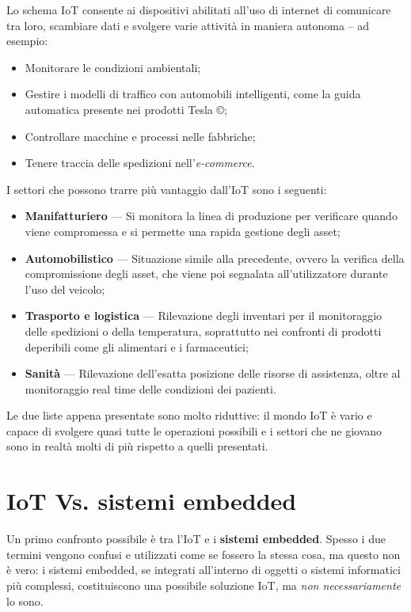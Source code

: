 \noindent Lo schema IoT consente ai dispositivi abilitati all'uso di internet di comunicare tra loro, scambiare dati e svolgere varie attività in maniera autonoma – ad esempio:
\begin{itemize}
    \item Monitorare le condizioni ambientali;
    \item Gestire i modelli di traffico con automobili intelligenti, come la guida automatica presente nei prodotti Tesla \copyright;
    \item Controllare macchine e processi nelle fabbriche;
    \item Tenere traccia delle spedizioni nell'\textit{e-commerce}.
\end{itemize}
I settori che possono trarre più vantaggio dall'IoT sono i seguenti\cite{iot-use}:
\begin{itemize}
    \item \textbf{Manifatturiero} --- Si monitora la linea di produzione per verificare quando viene compromessa e si permette una rapida gestione degli asset;
    \item \textbf{Automobilistico} --- Situazione simile alla precedente, ovvero la verifica della compromissione degli asset, che viene poi segnalata all'utilizzatore durante l'uso del veicolo; 
    \item \textbf{Trasporto e logistica} --- Rilevazione degli inventari per il monitoraggio delle spedizioni o della temperatura, soprattutto nei confronti di prodotti deperibili come gli alimentari e i farmaceutici;
    \item \textbf{Sanità} --- Rilevazione dell'esatta posizione delle risorse di assistenza, oltre al monitoraggio real time delle condizioni dei pazienti.
\end{itemize}
\noindent Le due liste appena presentate sono molto riduttive: il mondo IoT è vario e capace di svolgere quasi tutte le operazioni possibili e i settori che ne giovano sono in realtà molti di più rispetto a quelli presentati.

\section{IoT Vs. sistemi embedded}

Un primo confronto possibile è tra l'IoT e i \textbf{sistemi embedded}. Spesso i due termini vengono confusi e utilizzati come se fossero la stessa cosa, ma questo non è vero: i sistemi embedded, se integrati all’interno di oggetti o sistemi informatici più complessi, costituiscono una possibile soluzione IoT, ma \textit{non necessariamente} lo sono. \\

